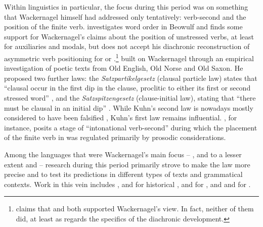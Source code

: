 Within  linguistics in particular, the focus during this period was on something that Wackernagel himself had addressed only tentatively: verb-second and the position of the finite verb. \citet[315--318]{Ries1907} investigates word order in Beowulf and finds some support for Wackernagel's claims about the position of unstressed verbs, at least for auxiliaries and modals, but does not accept his diachronic reconstruction of asymmetric verb positioning for  or .\footnote{\citet[15--16]{Hopper1975} claims that \citet{Ries1907} and \citet{Delbrueck1907} both supported Wackernagel's view. In fact, neither of them did, at least as regards the specifics of the diachronic development.} \citet{Kuhn1933} built on Wackernagel through an empirical investigation of poetic texts from Old English, Old Norse and Old Saxon. He proposed two further laws: the  \emph{Satzpartikelgesetz} (clausal particle law) states that ``clausal  occur in the first dip in the clause, proclitic to either its first or second stressed word'' \citep[8]{Kuhn1933}, and the  \emph{Satzspitzengesetz} (clause-initial law), stating that ``there must be clausal  in an initial dip'' \citep[43]{Kuhn1933}. While Kuhn's second law is nowadays mostly considered to have been falsified \citep{Momma1997,Mines2002}, Kuhn's first law remains influential. \citet{Dewey2006}, for instance, posits a stage of ``intonational verb-second'' during which the placement of the finite verb in  was regulated primarily by prosodic considerations.

Among the languages that were Wackernagel's main focus -- , and to a lesser extent  and  -- research during this period primarily strove to make the law more precise and to test its predictions in different types of texts and grammatical contexts. Work in this vein includes \citet{Dover1960}, \citet{Marshall1987} and \citet{Ruijgh1990} for historical , \citet{Marouzeau1907,Marouzeau1953} and \citet{Fraenkel1932,Fraenkel1933,Fraenkel1965} for , and \citet{Hale1987PhD,Hale1987wackernagel} and \citet{Krisch1990} for .

